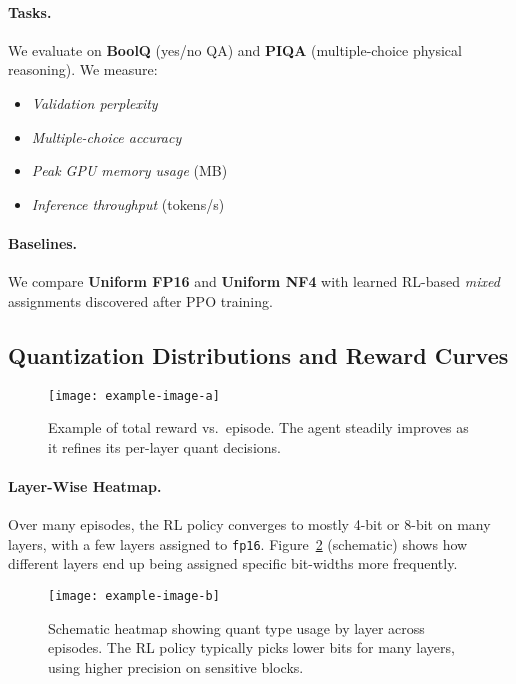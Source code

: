 \documentclass{article}
\begin{document}
	\paragraph{Tasks.}
	We evaluate on \textbf{BoolQ} (yes/no QA) and \textbf{PIQA} (multiple-choice physical reasoning). We measure:
	\begin{itemize}
		\item \emph{Validation perplexity}
		\item \emph{Multiple-choice accuracy}
		\item \emph{Peak GPU memory usage} (MB)
		\item \emph{Inference throughput} (tokens/s)
	\end{itemize}
	
	\paragraph{Baselines.}
	We compare \textbf{Uniform FP16} and \textbf{Uniform NF4} with learned RL-based \emph{mixed} assignments discovered after PPO training.
	
	\subsection{Quantization Distributions and Reward Curves}
	\begin{figure}[ht]
		\centering
		\texttt{[image: example-image-a]}
		\vspace{-1em}
		\caption{\small Example of total reward vs.\ episode. The agent steadily improves as it refines its per-layer quant decisions.}
		\label{fig:reward_curves}
		\vspace{-0.2em}
	\end{figure}
	
	\paragraph{Layer-Wise Heatmap.}
	Over many episodes, the RL policy converges to mostly 4-bit or 8-bit on many layers, with a few layers assigned to \texttt{fp16}. Figure~\ref{fig:heatmap} (schematic) shows how different layers end up being assigned specific bit-widths more frequently.
	
	\begin{figure}[ht]
		\centering
		\texttt{[image: example-image-b]}
		\vspace{-0.4em}
		\caption{\small Schematic heatmap showing quant type usage by layer across episodes. The RL policy typically picks lower bits for many layers, using higher precision on sensitive blocks.}
		\label{fig:heatmap}
		\vspace{-0.5em}
	\end{figure}
	
\end{document}
